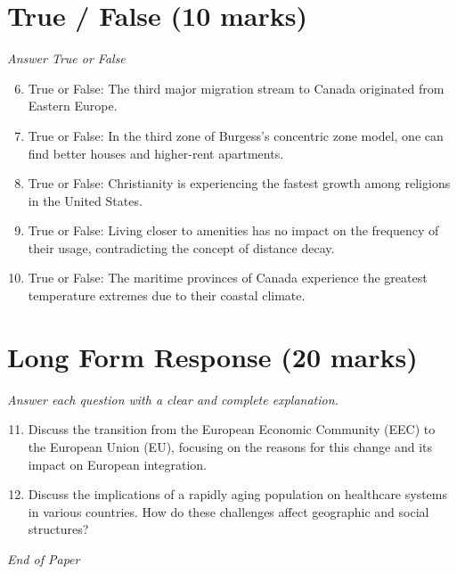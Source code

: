 \documentclass[12pt]{article}
\begin{document}
\section*{True / False (10 marks)}
\textit{Answer True or False}
\begin{enumerate}[label=\arabic*.]
\setcounter{enumi}{5}
\item True or False: The third major migration stream to Canada originated from Eastern Europe.
\item True or False: In the third zone of Burgess's concentric zone model, one can find better houses and higher-rent apartments.
\item True or False: Christianity is experiencing the fastest growth among religions in the United States.
\item True or False: Living closer to amenities has no impact on the frequency of their usage, contradicting the concept of distance decay.
\item True or False: The maritime provinces of Canada experience the greatest temperature extremes due to their coastal climate.
\end{enumerate}

\section*{Long Form Response (20 marks)}
\textit{Answer each question with a clear and complete explanation.}
\begin{enumerate}[label=\arabic*.]
\setcounter{enumi}{10}
\item Discuss the transition from the European Economic Community (EEC) to the European Union (EU), focusing on the reasons for this change and its impact on European integration.
\item Discuss the implications of a rapidly aging population on healthcare systems in various countries. How do these challenges affect geographic and social structures?
\end{enumerate}

\vfill
\noindent\textit{End of Paper}
\end{document}
